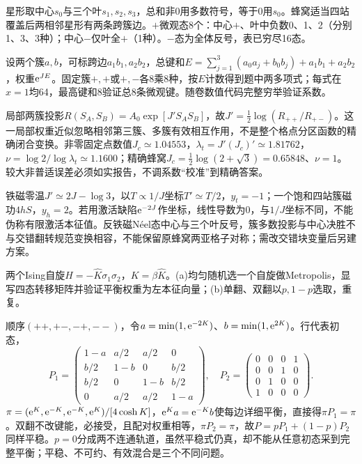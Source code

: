 \begin{solution}
星形取中心$s_0$与三个叶$s_1,s_2,s_3$，总和非0用多数符号，等于0用$s_0$。蜂窝适当四站覆盖后两相邻星形有两条跨簇边。$+$微观态8个：中心$+$、叶中负数0、1、2（分别1、3、3种）；中心$-$仅叶全$+$（1种）。$-$态为全体反号，表已穷尽16态。

设两个簇$a,b$，可标跨边$a_1b_1,a_2b_2$，总键和$E=\sum_{j=1}^3(a_0a_j+b_0b_j)+a_1b_1+a_2b_2$，权重$\mathrm e^{JE}$。固定簇$+,+$或$+,-$各8乘8种，按$E$计数得到题中两多项式；每式在$x=1$均64，最高键和8验证总8条微观键。随卷数值代码完整穷举验证系数。

局部两簇投影$R(S_A,S_B)=A_0\exp[J'S_AS_B]$，故$J'=\tfrac12\log(R_{++}/R_{+-})$。这一局部权重近似忽略相邻第三簇、多簇有效相互作用，不是整个格点分区函数的精确闭合变换。非零固定点数值$J_c\simeq1.04553$，$\lambda_t=J'(J_c)'\simeq1.81762$，$\nu=\log2/\log\lambda_t\simeq1.1600$；精确蜂窝$J_c=\tfrac12\log(2+\sqrt3)=0.65848$、$\nu=1$。较大非普适误差必须如实报告，不调系数“校准”到精确答案。

铁磁零温$J'\simeq2J-\log3$，以$T\propto1/J$坐标$T'\simeq T/2$，$y_t=-1$；一个饱和四站簇磁功$4hS$，$y_h=2$。若用激活缺陷$\mathrm e^{-2J}$作坐标，线性导数为0，与$1/J$坐标不同，不能伪称有限激活本征值。反铁磁Néel态中心与三个叶反号，簇多数投影与中心决胜不与交错翻转规范变换相容，不能保留原蜂窝两亚格子对称；需改交错块变量后另建方案。
\end{solution}
\begin{exercise}[原题7(a),(b)，选做]\label{p:334-4-7}
两个Ising自旋$H=-\widehat K\sigma_1\sigma_2$，$K=\beta\widehat K$。(a)均匀随机选一个自旋做Metropolis，显写四态转移矩阵并验证平衡权重为左本征向量；(b)单翻、双翻以$p,1-p$选取，重复。
\end{exercise}
\begin{solution}
顺序$(++,+-,-+,--)$，令$a=\min(1,\mathrm e^{-2K})$、$b=\min(1,\mathrm e^{2K})$。行代表初态，
\begin{equation}
P_1=\begin{pmatrix}1-a&a/2&a/2&0\\b/2&1-b&0&b/2\\b/2&0&1-b&b/2\\0&a/2&a/2&1-a\end{pmatrix},\quad
P_2=\begin{pmatrix}0&0&0&1\\0&0&1&0\\0&1&0&0\\1&0&0&0\end{pmatrix}.
\end{equation}
$\pi=(\mathrm e^K,\mathrm e^{-K},\mathrm e^{-K},\mathrm e^K)/[4\cosh K]$，$\mathrm e^Ka=\mathrm e^{-K}b$使每边详细平衡，直接得$\pi P_1=\pi$。双翻不改键能，必接受，且配对权重相等，$\pi P_2=\pi$，故$P=pP_1+(1-p)P_2$同样平稳。$p=0$分成两不连通轨道，虽然平稳式仍真，却不能从任意初态采到完整平衡；平稳、不可约、有效混合是三个不同问题。
\end{solution}
